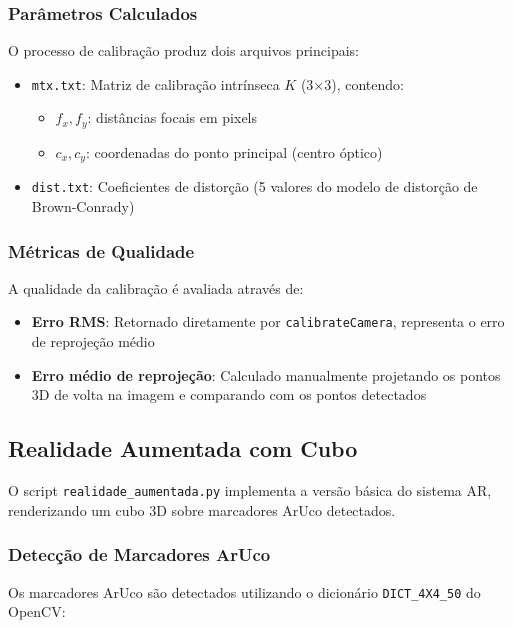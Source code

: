 \subsubsection{Parâmetros Calculados}

O processo de calibração produz dois arquivos principais:

\begin{itemize}
    \item \texttt{mtx.txt}: Matriz de calibração intrínseca $K$ (3×3), contendo:
    \begin{itemize}
        \item $f_x, f_y$: distâncias focais em pixels
        \item $c_x, c_y$: coordenadas do ponto principal (centro óptico)
    \end{itemize}
    \item \texttt{dist.txt}: Coeficientes de distorção (5 valores do modelo de distorção de Brown-Conrady)
\end{itemize}

\subsubsection{Métricas de Qualidade}

A qualidade da calibração é avaliada através de:

\begin{itemize}
    \item \textbf{Erro RMS}: Retornado diretamente por \texttt{calibrateCamera}, representa o erro de reprojeção médio
    \item \textbf{Erro médio de reprojeção}: Calculado manualmente projetando os pontos 3D de volta na imagem e comparando com os pontos detectados
\end{itemize}

\subsection{Realidade Aumentada com Cubo}

O script \texttt{realidade\_aumentada.py} implementa a versão básica do sistema AR, renderizando um cubo 3D sobre marcadores ArUco detectados.

\subsubsection{Detecção de Marcadores ArUco}

Os marcadores ArUco são detectados utilizando o dicionário \texttt{DICT\_4X4\_50} do OpenCV:

